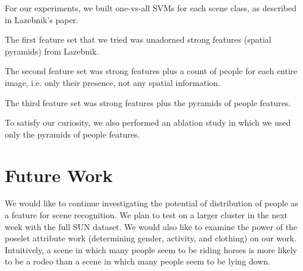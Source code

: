 \documentclass[11pt]{article}
\begin{document}
For our experiments, we built one-vs-all SVMs for each scene class, as described in Lazebnik's paper.

The first feature set that we tried was unadorned strong features (spatial pyramids) from Lazebnik.

The second feature set was strong features plus a count of people for each entire image, i.e. only their presence, not any spatial information.

The third feature set was strong features plus the pyramids of people features.

To satisfy our curiosity, we also performed an ablation study in which we used only the pyramids of people features.

\section{Future Work}
We would like to continue investigating the potential of distribution of people as a feature for scene recognition.  We plan to test on a larger cluster in the next week with the full SUN dataset.  We would also like to examine the power of the poselet attribute work (determining gender, activity, and clothing) on our work.  Intuitively, a scene in which many people seem to be riding horses is more likely to be a rodeo than a scene in which many people seem to be lying down.



\end{document}
